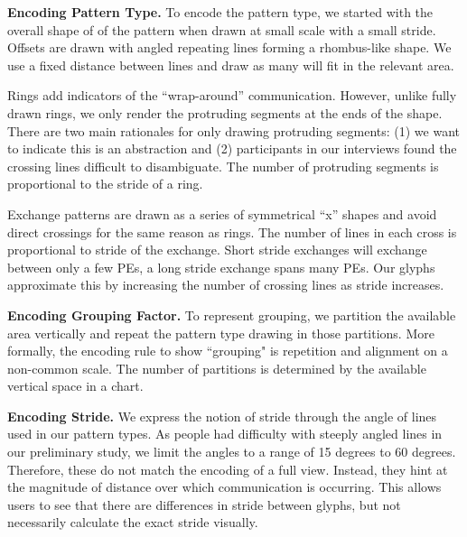 \vspace{1ex}

\textbf{Encoding Pattern Type.} To encode the pattern type, we started with the overall shape of of the pattern when drawn at small scale with a small stride. Offsets are drawn with angled repeating lines forming a rhombus-like shape. We use a fixed distance between lines and draw as many will fit in the relevant area.

Rings add indicators of the ``wrap-around'' communication. However, unlike fully drawn rings, we only render the protruding segments at the ends of the shape. There are two main rationales for only drawing protruding segments: (1) we want to indicate this is an abstraction and (2) participants in our interviews found the crossing lines difficult to disambiguate. The number of protruding segments is proportional to the stride of a ring. 

Exchange patterns are drawn as a series of symmetrical ``x'' shapes and avoid direct crossings for the same reason as rings. The number of lines in each cross is proportional to stride of the exchange. Short stride exchanges will exchange between only a few PEs, a long stride exchange spans many PEs. Our glyphs approximate this by increasing the number of crossing lines as stride increases.

\vspace{1ex}

\textbf{Encoding Grouping Factor.} To represent grouping, we partition the available area vertically and repeat the pattern type drawing in those partitions. More formally, the encoding rule to show ``grouping" is repetition and alignment on a non-common scale. The number of partitions is determined by the available vertical space in a chart.


\vspace{1ex}

\textbf{Encoding Stride.} We express the notion of stride through the angle of lines used in our pattern types. As people had difficulty with steeply angled lines in our preliminary study, we limit the angles to a range of 15 degrees to 60 degrees. Therefore, these do not match the encoding of a full view. Instead, they hint at the magnitude of distance over which communication is occurring. This allows users to see that there are differences in stride between glyphs, but not necessarily calculate the exact stride visually.

